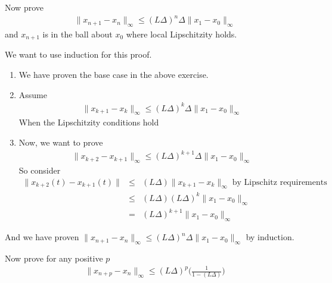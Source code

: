 \documentclass[11pt]{SelfArxOneColBMN}
\begin{document}
\begin{exercise}
Now prove
\begin{eqnarray*}
\|x_{n+1} - x_n\|_\infty \leq (L \Delta)^n  \Delta  \|x_1 - x_0\|_\infty
\end{eqnarray*}
\noindent
and $x_{n+1}$ is in the ball about $x_0$ where local Lipschitzity holds.
\end{exercise}

\begin{solution}
We want to use induction for this proof.
\begin{enumerate}
  \item We have proven the base case in the above exercise.
  \item Assume
  \begin{eqnarray*}
    \|x_{k+1} - x_{k} \|_\infty \leq (L\Delta)^k\Delta\|x_1 - x_0\|_\infty
  \end{eqnarray*}
  When the Lipschitzity conditions hold
  \item Now, we want to prove
  \begin{eqnarray*}
    \|x_{k+2} - x_{k+1} \|_\infty \leq (L\Delta)^{k+1}\Delta\|x_1 - x_0\|_\infty
  \end{eqnarray*}
  So consider
  \begin{eqnarray*}
    \|x_{k+2}(t) - x_{k+1}(t) \| &\leq& (L\Delta)\|x_{k+1} - x_k\|_\infty \; \text{by Lipschitz requirements}\\
    &\leq& (L\Delta)(L\Delta)^k\|x_1 - x_0\|_\infty\\
    &=& (L\Delta)^{k+1}\|x_1 - x_0\|_\infty
  \end{eqnarray*}
\end{enumerate}
And we have proven $\|x_{n+1} - x_n\|_\infty \leq (L \Delta)^n  \Delta  \|x_1 - x_0\|_\infty$ by induction.
\end{solution}

\begin{exercise}
Now prove for any positive $p$
\begin{eqnarray*}
\|x_{n+p} - x_n\|_\infty \leq (L \Delta)^p  \biggl ( \frac{1}{1 - (L \Delta)} \biggr)
\end{eqnarray*}
\end{exercise}
\end{document}
